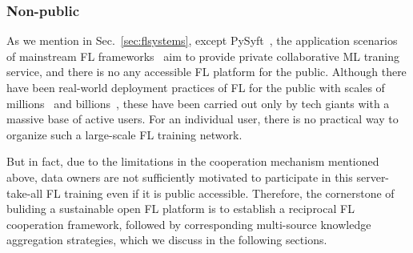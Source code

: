 \subsubsection{Non-public} %
As we mention in Sec.~\ref{sec:flsystems}, except PySyft~\cite{ziller2021pysyft}, the application scenarios of mainstream FL frameworks~\cite{liu2021fate, abadi2016tensorflow, zeng2021fedlab, caldas2018leaf, ibmfl2020ibm, he2020fedml, beutel2020flower, roth2022nvidia} aim to provide private collaborative ML traning service, and there is no any accessible FL platform for the public.
Although there have been real-world deployment practices of FL for the public with scales of millions~\cite{bonawitz2019towards} and billions~\cite{niu2020billion}, these have been carried out only by tech giants with a massive base of active users. For an individual user, there is no practical way to organize such a large-scale FL training network.

But in fact, due to the limitations in the cooperation mechanism mentioned above, data owners are not sufficiently motivated to participate in this server-take-all FL training even if it is public accessible. Therefore, the cornerstone of buliding a sustainable open FL platform is to establish a reciprocal FL cooperation framework, followed by corresponding multi-source knowledge aggregation strategies, which we discuss in the following sections.